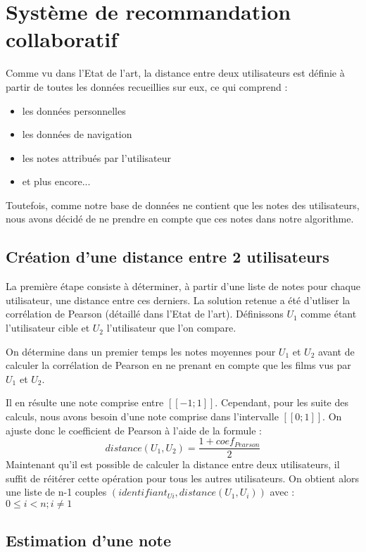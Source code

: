 \section{Système de recommandation collaboratif}
Comme vu dans l'Etat de l'art, la distance entre deux utilisateurs est définie à partir de toutes les données recueillies sur eux, ce qui comprend :
\begin{itemize}
	\item les données personnelles
	\item les données de navigation
	\item les notes attribués par l'utilisateur
	\item et plus encore...
\end{itemize}
Toutefois, comme notre base de données ne contient que les notes des utilisateurs, nous avons décidé de ne prendre en compte que ces notes dans notre algorithme.

\subsection{Création d'une distance entre 2 utilisateurs}

La première étape consiste à déterminer, à partir d'une liste de notes pour chaque utilisateur, une distance entre ces derniers. La solution retenue a été d'utliser la corrélation de Pearson (détaillé dans l'Etat de l'art). Définissons $U_{1}$ comme étant l'utilisateur cible et $U_{2}$ l'utilisateur que l'on compare.\par
On détermine dans un premier temps les notes moyennes pour $U_{1}$ et $U_{2}$ avant de calculer la corrélation de Pearson en ne prenant en compte que les films vus par $U_{1}$ et $U_{2}$.\par
Il en résulte une note comprise entre $[\![-1;1]\!]$. Cependant, pour les suite des calculs, nous avons besoin d'une note comprise dans l'intervalle $[\![0;1]\!]$. On ajuste donc le coefficient de Pearson à l'aide de la formule :
$$distance(U_1, U_2) = \frac{1 + coef_{Pearson}}{2}$$
Maintenant qu'il est possible de calculer la distance entre deux utilisateurs, il suffit de réitérer cette opération pour tous les autres utilisateurs. On obtient alors une liste de n-1 couples ${(identifiant_{Ui}, distance(U_1, U_i))}$ avec : $0 \leqslant i < n  ;  i\neq1$

\subsection{Estimation d'une note}

